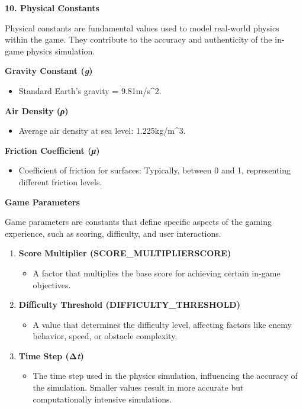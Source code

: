 \documentclass[
]{article}
\begin{document}
\textbf{10. Physical Constants}

Physical constants are fundamental values used to model real-world
physics within the game. They contribute to the accuracy and
authenticity of the in-game physics simulation.

\textbf{Gravity Constant (\emph{g})}

\begin{itemize}
\item
  Standard Earth's gravity = 9.81m/s\^{}2.
\end{itemize}

\textbf{Air Density (\emph{ρ})}

\begin{itemize}
\item
  Average air density at sea level: 1.225kg/m\^{}3.
\end{itemize}

\textbf{Friction Coefficient (\emph{μ})}

\begin{itemize}
\item
  Coefficient of friction for surfaces: Typically, between 0 and 1,
  representing different friction levels.
\end{itemize}

\textbf{Game Parameters}

Game parameters are constants that define specific aspects of the gaming
experience, such as scoring, difficulty, and user interactions.

\begin{enumerate}
\def\labelenumi{\arabic{enumi}.}
\item
  \textbf{Score Multiplier (SCORE\_MULTIPLIERSCORE)}

  \begin{itemize}
  \item
    A factor that multiplies the base score for achieving certain
    in-game objectives.
  \end{itemize}
\item
  \textbf{Difficulty Threshold (DIFFICULTY\_THRESHOLD)}

  \begin{itemize}
  \item
    A value that determines the difficulty level, affecting factors like
    enemy behavior, speed, or obstacle complexity.
  \end{itemize}
\item
  \textbf{Time Step (Δ\emph{t})}

  \begin{itemize}
  \item
    The time step used in the physics simulation, influencing the
    accuracy of the simulation. Smaller values result in more accurate
    but computationally intensive simulations.
  \end{itemize}
\end{enumerate}
\end{document}
